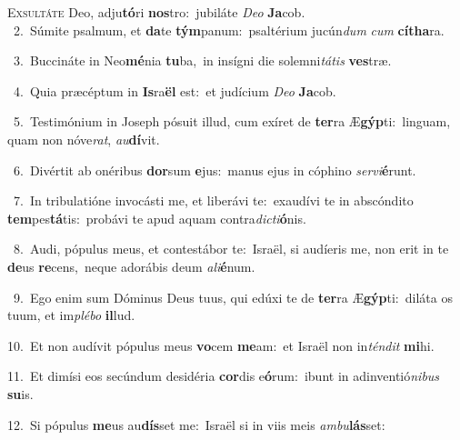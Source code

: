 \lettrine{\initial\textcolor{\initialcolor}{E}}{xsultáte} Deo, adju\-\textbf{tó}\-ri \textbf{nos}\-tro:~\star jubiláte \textit{De}\-\textit{o} \textbf{Ja}\-cob.\\
{\numbfont\textcolor{\numbcolor}{~2.}}~Súmite psalmum, et \textbf{da}\-te \textbf{tým}\-panum:~\star psaltérium jucún\textit{dum} \textit{cum} \textbf{cí}\-\textbf{tha}ra.\par
{\numbfont\textcolor{\numbcolor}{~3.}}~Buccináte in Neo\-\textbf{mé}\-nia \textbf{tu}\-ba,~\star in insígni die solemni\-\textit{tá}\-\textit{tis} \textbf{ves}\-træ.\par
{\numbfont\textcolor{\numbcolor}{~4.}}~Quia præcéptum in \textbf{Is}\-ra\textbf{ël} est:~\star et judícium \textit{De}\-\textit{o} \textbf{Ja}\-cob.\par
{\numbfont\textcolor{\numbcolor}{~5.}}~Testimónium in Joseph pósuit illud, cum exíret de \textbf{ter}\-ra Æ\-\textbf{gýp}\-ti:~\star linguam, quam non nóve\-\textit{rat}\-, \textit{au}\-\textbf{dí}vit.\par
{\numbfont\textcolor{\numbcolor}{~6.}}~Divértit ab onéribus \textbf{dor}\-sum \textbf{e}\-jus:~\star manus ejus in cóphino \textit{ser}\-\textit{vi}\textbf{é}runt.\par
{\numbfont\textcolor{\numbcolor}{~7.}}~In tribulatióne invocásti me, et liberávi te:~\dagger exaudívi te in abscóndito \textbf{tem}\-pes\-\textbf{tá}\-tis:~\star probávi te apud aquam contra\-\textit{dic}\-\textit{ti}\textbf{ó}nis.\par
{\numbfont\textcolor{\numbcolor}{~8.}}~Audi, pópulus meus, et contestábor te:~\dagger Israël, si audíeris me, non erit in te \textbf{de}\-us \textbf{re}\-cens,~\star neque adorábis deum \textit{a}\-\textit{li}\textbf{é}num.\par
{\numbfont\textcolor{\numbcolor}{~9.}}~Ego enim sum Dóminus Deus tuus, qui edúxi te de \textbf{ter}\-ra Æ\-\textbf{gýp}\-ti:~\star diláta os tuum, et im\-\textit{plé}\-\textit{bo} \textbf{il}\-lud.\par
{\numbfont\textcolor{\numbcolor}{10.}}~Et non audívit pópulus meus \textbf{vo}\-cem \textbf{me}\-am:~\star et Israël non in\-\textit{tén}\-\textit{dit} \textbf{mi}\-hi.\par
{\numbfont\textcolor{\numbcolor}{11.}}~Et dimísi eos secúndum desidéria \textbf{cor}\-dis e\-\textbf{ó}\-rum:~\star ibunt in adinventió\-\textit{ni}\-\textit{bus} \textbf{su}\-is.\par
{\numbfont\textcolor{\numbcolor}{12.}}~Si pópulus \textbf{me}\-us au\-\textbf{dís}\-set me:~\star Israël si in viis meis \textit{am}\-\textit{bu}\textbf{lás}set:\par

